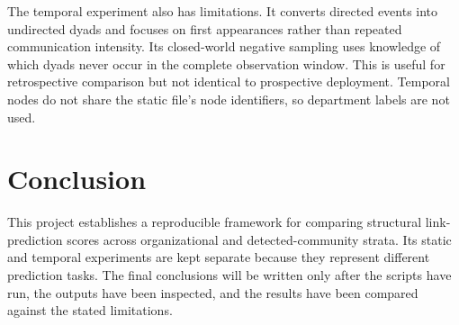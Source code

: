 \documentclass[11pt,a4paper]{article}
\begin{document}
The temporal experiment also has limitations. It converts directed events into undirected dyads and focuses on first appearances rather than repeated communication intensity. Its closed-world negative sampling uses knowledge of which dyads never occur in the complete observation window. This is useful for retrospective comparison but not identical to prospective deployment. Temporal nodes do not share the static file's node identifiers, so department labels are not used.

\section{Conclusion}
This project establishes a reproducible framework for comparing structural link-prediction scores across organizational and detected-community strata. Its static and temporal experiments are kept separate because they represent different prediction tasks. The final conclusions will be written only after the scripts have run, the outputs have been inspected, and the results have been compared against the stated limitations.



\end{document}
